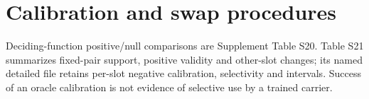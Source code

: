 \clearpage
\section{Calibration and swap procedures}\label{app:calibration}


Deciding-function positive/null comparisons are Supplement Table S20. Table S21
summarizes fixed-pair support, positive validity and other-slot changes; its
named detailed file retains per-slot negative calibration, selectivity and intervals.
Success of an oracle calibration is not evidence of selective use by a trained carrier.

